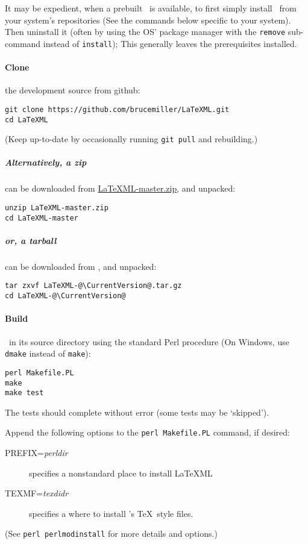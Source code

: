 \documentclass{article}
\begin{document}
It may be expedient, when a prebuilt \LaTeXML\ is available,
to first simply install \LaTeXML\ from your system's repositories
(See the commands below specific to your system).
Then uninstall it 
(often by using the OS' package manager with the \texttt{remove} sub-command
instead of \texttt{install});
This generally leaves the prerequisites installed.

\paragraph*{Clone}
the development source from github:
\begin{lstlisting}[style=shell]
git clone https://github.com/brucemiller/LaTeXML.git
cd LaTeXML
\end{lstlisting}
(Keep up-to-date by occasionally running 
\lstinline[style=shell]{git pull} and rebuilding.)

\subparagraph*{Alternatively, a zip} can be downloaded from
\href{https://github.com/brucemiller/LaTeXML/archive/master.zip}{LaTeXML-master.zip},
and unpacked:
\begin{lstlisting}[style=shell]
unzip LaTeXML-master.zip
cd LaTeXML-master
\end{lstlisting}
\subparagraph{or, a tarball} can be downloaded from \CurrentDownload, and unpacked:
\begin{lstlisting}[style=shell]
tar zxvf LaTeXML-@\CurrentVersion@.tar.gz
cd LaTeXML-@\CurrentVersion@
\end{lstlisting}

\paragraph*{Build}
\LaTeXML\ in its source directory using the standard Perl procedure
(On Windows, use \texttt{dmake} instead of \texttt{make}):
\begin{lstlisting}[style=shell]
perl Makefile.PL
make
make test
\end{lstlisting}
The tests should complete without error (some tests may be `skipped').

Append the following options to the \texttt{perl Makefile.PL} command, if desired:
\begin{description}
\item[PREFIX=\textit{perldir}] specifies a nonstandard place to install LaTeXML
\item[TEXMF=\textit{texdidr}] specifies a where to install \LaTeXML's \TeX\ style files.
\end{description}
(See \texttt{perl perlmodinstall} for more details and options.)
\end{document}
